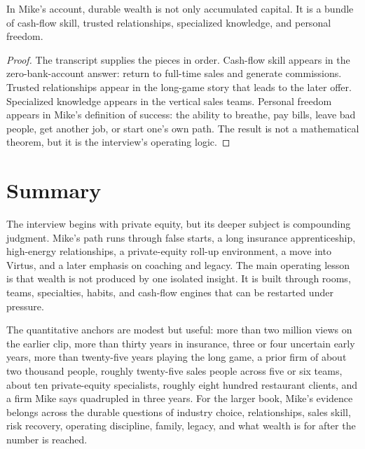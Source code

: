 \begin{proposition}
In Mike's account, durable wealth is not only accumulated capital. It is a bundle of cash-flow skill, trusted relationships, specialized knowledge, and personal freedom.
\end{proposition}

\begin{proof}
The transcript supplies the pieces in order. Cash-flow skill appears in the zero-bank-account answer: return to full-time sales and generate commissions. Trusted relationships appear in the long-game story that leads to the later offer. Specialized knowledge appears in the vertical sales teams. Personal freedom appears in Mike's definition of success: the ability to breathe, pay bills, leave bad people, get another job, or start one's own path. The result is not a mathematical theorem, but it is the interview's operating logic.
\end{proof}

\section{Summary}

The interview begins with private equity, but its deeper subject is compounding judgment. Mike's path runs through false starts, a long insurance apprenticeship, high-energy relationships, a private-equity roll-up environment, a move into Virtus, and a later emphasis on coaching and legacy. The main operating lesson is that wealth is not produced by one isolated insight. It is built through rooms, teams, specialties, habits, and cash-flow engines that can be restarted under pressure.

The quantitative anchors are modest but useful: more than two million views on the earlier clip, more than thirty years in insurance, three or four uncertain early years, more than twenty-five years playing the long game, a prior firm of about two thousand people, roughly twenty-five sales people across five or six teams, about ten private-equity specialists, roughly eight hundred restaurant clients, and a firm Mike says quadrupled in three years. For the larger book, Mike's evidence belongs across the durable questions of industry choice, relationships, sales skill, risk recovery, operating discipline, family, legacy, and what wealth is for after the number is reached.